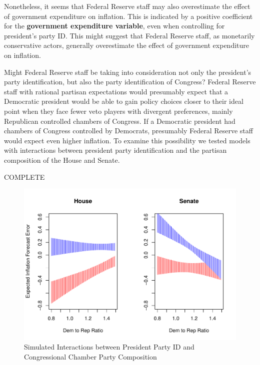 \documentclass[a4paper]{article}\usepackage{graphicx, color}
\newenvironment{knitrout}{}{} %
\begin{document}
Nonetheless, it seems that Federal Reserve staff may also overestimate the effect of government expenditure on inflation. This is indicated by a positive coefficient for the {\bf{government expenditure variable}}, even when controlling for president's party ID. This might suggest that Federal Reserve staff, as monetarily conservative actors, generally overestimate the effect of government expenditure on inflation.

Might Federal Reserve staff be taking into consideration not only the president's party identification, but also the party identification of Congress? Federal Reserve staff with rational partisan expectations would presumably expect that a Democratic president would be able to gain policy choices closer to their ideal point when they face fewer veto players with divergent preferences, mainly Republican controlled chambers of Congress. If a Democratic president had chambers of Congress controlled by Democrats, presumably Federal Reserve staff would expect even higher inflation. To examine this possibility we tested models with interactions between president party identification and the partisan composition of the House and Senate.

COMPLETE

\begin{figure}[t]
    \caption{Simulated Interactions between President Party ID and Congressional Chamber Party Composition}
    \label{InteractionPlots}
    \begin{center}

\begin{knitrout}
\color{fgcolor}\includegraphics[width=0.95\linewidth]{figure/interPlots} 
\end{knitrout}


    \end{center}
\end{figure}
\end{document}
